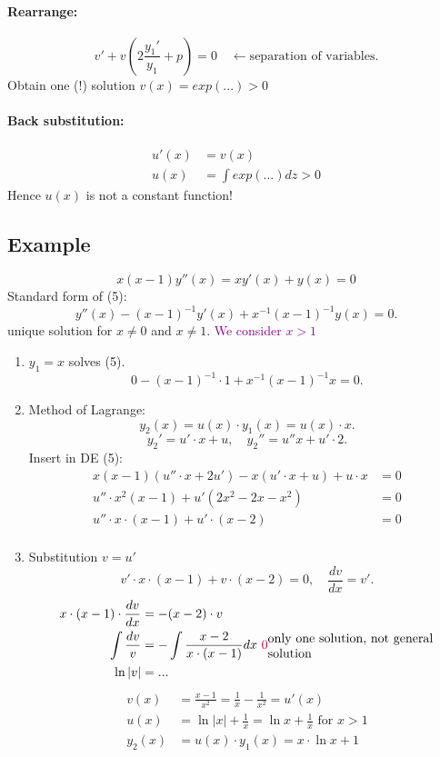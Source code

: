 \documentclass[]{article}
\begin{document}
\paragraph{Rearrange:} 
\[
v'+v(2 \frac{y_1'}{y_1}+p)=0\quad\leftarrow \text{separation of variables}
.\]
Obtain one (!) solution $v(x)=exp(...) >0$ 
\paragraph{Back substitution:} \[\begin{split}
	u'(x) &= v(x) \\
	u(x) &= \int exp(...) dz >0
\end{split}\]
Hence $u(x)$ is not a constant function!
\subsection{Example}
\begin{equation}
x(x-1)y''(x)=xy'(x)+y(x)=0
\end{equation}
Standard form of (5):
\[
y''(x)-(x-1) ^{-1}y'(x)+x ^{-1} (x-1) ^{-1} y(x)=0
.\] 
unique solution for $x\not=0$ and $x\not=1$.  \textcolor{purple}{We consider $x >1$}
\begin{enumerate}
	\item $y_1=x$ solves (5).  \[
	0-(x-1) ^{-1} \cdot 1+ x ^{-1}(x-1) ^{-1}x=0
	.\]
\item Method of Lagrange:
	\[
	y_2(x)=u(x) \cdot y_1(x)=u(x) \cdot x
	.\]
	\[
	y_2'=u' \cdot x +u,\quad y_2''=u'' x+ u' \cdot 2
	.\]
	Insert in DE (5):
	\[\begin{aligned}
		x(x-1)(u'' \cdot  x+2u')-x(u' \cdot x+ u)+ u \cdot x &=0  \\
		u'' \cdot x ^{2} (x-1) +u'(2x ^{2}-2x-x ^{2}) &=0\\
		u'' \cdot x \cdot (x-1) + u' \cdot (x-2) &=0\\
	\end{aligned}\]
\item Substitution $v=u'$
	 \[
	v' \cdot x \cdot (x-1) +v \cdot (x-2) = 0,\quad \frac{dv}{dx}=v'
	.\]
	\[\begin{split}
		x \cdot (x-1) \cdot \frac{dv}{dx} & = -(x-2) \cdot v \\
		\int \frac{dv}{v} & =-\int \frac{x-2}{x \cdot (x-1)} dx \text{ \textcolor{purple}{$0$}} \parbox{13em}{only one solution, not general solution}\\
		\ln |v| &=...\\
	\end{split}\]
	\[\begin{split}
		v(x) & = \frac{x-1}{x ^{2}}= \frac{1}{x}- \frac{1}{x ^{2}}=u'(x) \\
		u(x) & = \ln|x| + \frac{1}{x}= \ln x + \frac{1}{x} \text{ for } x >1\\
		y_2(x) &= u(x) \cdot y_1(x) = x \cdot \ln x +1 \\
	\end{split}\]
\end{enumerate}
\end{document}
